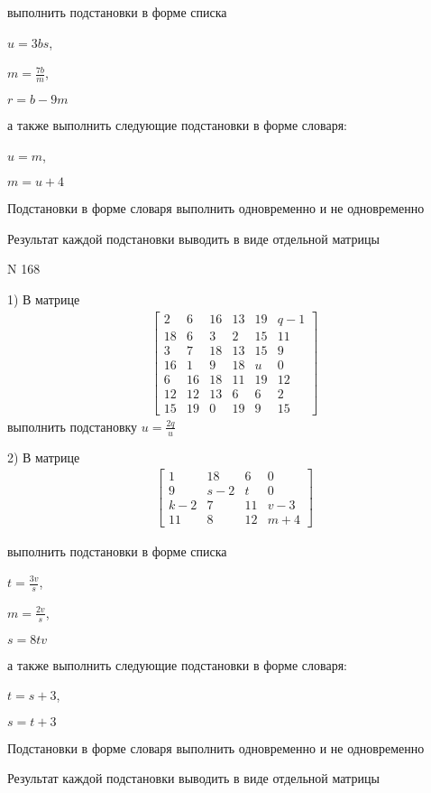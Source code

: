 \documentclass[11pt]{report}
\begin{document}
выполнить подстановки в форме списка

$u=3 b s$,

$m=\frac{7 b}{m}$,

$r=b - 9 m$

а также выполнить следующие подстановки в форме словаря:

$u=m$,

$m=u + 4$


    Подстановки в форме словаря выполнить одновременно и не одновременно


    Результат каждой подстановки выводить в виде отдельной матрицы

\newpage
N 168


    1) В матрице
\begin{align*}
\left[\begin{matrix}2 & 6 & 16 & 13 & 19 & q - 1\\18 & 6 & 3 & 2 & 15 & 11\\3 & 7 & 18 & 13 & 15 & 9\\16 & 1 & 9 & 18 & u & 0\\6 & 16 & 18 & 11 & 19 & 12\\12 & 12 & 13 & 6 & 6 & 2\\15 & 19 & 0 & 19 & 9 & 15\end{matrix}\right]
\end{align*}
выполнить подстановку $u=\frac{2 q}{u}$


    2) В матрице
\begin{align*}
\left[\begin{matrix}1 & 18 & 6 & 0\\9 & s - 2 & t & 0\\k - 2 & 7 & 11 & v - 3\\11 & 8 & 12 & m + 4\end{matrix}\right]
\end{align*}

выполнить подстановки в форме списка

$t=\frac{3 v}{s}$,

$m=\frac{2 v}{s}$,

$s=8 t v$

а также выполнить следующие подстановки в форме словаря:

$t=s + 3$,

$s=t + 3$


    Подстановки в форме словаря выполнить одновременно и не одновременно


    Результат каждой подстановки выводить в виде отдельной матрицы
\end{document}
